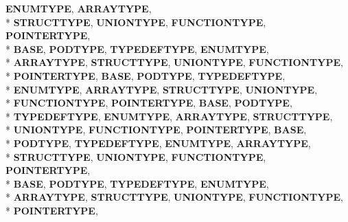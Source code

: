 \begin{DoxyCompactItemize}
{\bfseries E\-N\-U\-M\-T\-Y\-P\-E}, 
{\bfseries A\-R\-R\-A\-Y\-T\-Y\-P\-E}, 
\\*
{\bfseries S\-T\-R\-U\-C\-T\-T\-Y\-P\-E}, 
{\bfseries U\-N\-I\-O\-N\-T\-Y\-P\-E}, 
{\bfseries F\-U\-N\-C\-T\-I\-O\-N\-T\-Y\-P\-E}, 
{\bfseries P\-O\-I\-N\-T\-E\-R\-T\-Y\-P\-E}, 
\\*
{\bfseries B\-A\-S\-E}, 
{\bfseries P\-O\-D\-T\-Y\-P\-E}, 
{\bfseries T\-Y\-P\-E\-D\-E\-F\-T\-Y\-P\-E}, 
{\bfseries E\-N\-U\-M\-T\-Y\-P\-E}, 
\\*
{\bfseries A\-R\-R\-A\-Y\-T\-Y\-P\-E}, 
{\bfseries S\-T\-R\-U\-C\-T\-T\-Y\-P\-E}, 
{\bfseries U\-N\-I\-O\-N\-T\-Y\-P\-E}, 
{\bfseries F\-U\-N\-C\-T\-I\-O\-N\-T\-Y\-P\-E}, 
\\*
{\bfseries P\-O\-I\-N\-T\-E\-R\-T\-Y\-P\-E}, 
{\bfseries B\-A\-S\-E}, 
{\bfseries P\-O\-D\-T\-Y\-P\-E}, 
{\bfseries T\-Y\-P\-E\-D\-E\-F\-T\-Y\-P\-E}, 
\\*
{\bfseries E\-N\-U\-M\-T\-Y\-P\-E}, 
{\bfseries A\-R\-R\-A\-Y\-T\-Y\-P\-E}, 
{\bfseries S\-T\-R\-U\-C\-T\-T\-Y\-P\-E}, 
{\bfseries U\-N\-I\-O\-N\-T\-Y\-P\-E}, 
\\*
{\bfseries F\-U\-N\-C\-T\-I\-O\-N\-T\-Y\-P\-E}, 
{\bfseries P\-O\-I\-N\-T\-E\-R\-T\-Y\-P\-E}, 
{\bfseries B\-A\-S\-E}, 
{\bfseries P\-O\-D\-T\-Y\-P\-E}, 
\\*
{\bfseries T\-Y\-P\-E\-D\-E\-F\-T\-Y\-P\-E}, 
{\bfseries E\-N\-U\-M\-T\-Y\-P\-E}, 
{\bfseries A\-R\-R\-A\-Y\-T\-Y\-P\-E}, 
{\bfseries S\-T\-R\-U\-C\-T\-T\-Y\-P\-E}, 
\\*
{\bfseries U\-N\-I\-O\-N\-T\-Y\-P\-E}, 
{\bfseries F\-U\-N\-C\-T\-I\-O\-N\-T\-Y\-P\-E}, 
{\bfseries P\-O\-I\-N\-T\-E\-R\-T\-Y\-P\-E}, 
{\bfseries B\-A\-S\-E}, 
\\*
{\bfseries P\-O\-D\-T\-Y\-P\-E}, 
{\bfseries T\-Y\-P\-E\-D\-E\-F\-T\-Y\-P\-E}, 
{\bfseries E\-N\-U\-M\-T\-Y\-P\-E}, 
{\bfseries A\-R\-R\-A\-Y\-T\-Y\-P\-E}, 
\\*
{\bfseries S\-T\-R\-U\-C\-T\-T\-Y\-P\-E}, 
{\bfseries U\-N\-I\-O\-N\-T\-Y\-P\-E}, 
{\bfseries F\-U\-N\-C\-T\-I\-O\-N\-T\-Y\-P\-E}, 
{\bfseries P\-O\-I\-N\-T\-E\-R\-T\-Y\-P\-E}, 
\\*
{\bfseries B\-A\-S\-E}, 
{\bfseries P\-O\-D\-T\-Y\-P\-E}, 
{\bfseries T\-Y\-P\-E\-D\-E\-F\-T\-Y\-P\-E}, 
{\bfseries E\-N\-U\-M\-T\-Y\-P\-E}, 
\\*
{\bfseries A\-R\-R\-A\-Y\-T\-Y\-P\-E}, 
{\bfseries S\-T\-R\-U\-C\-T\-T\-Y\-P\-E}, 
{\bfseries U\-N\-I\-O\-N\-T\-Y\-P\-E}, 
{\bfseries F\-U\-N\-C\-T\-I\-O\-N\-T\-Y\-P\-E}, 
\\*
{\bfseries P\-O\-I\-N\-T\-E\-R\-T\-Y\-P\-E}, 

\end{DoxyCompactItemize}
